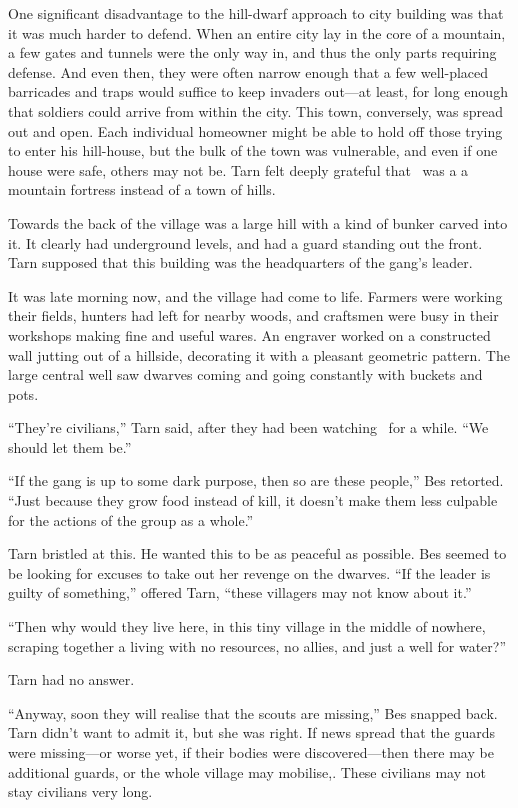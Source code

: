 One significant disadvantage to the hill-dwarf approach to city building was that it was much harder to defend.  When an entire city lay in the core of a mountain, a few gates and tunnels were the only way in, and thus the only parts requiring defense.  And even then, they were often narrow enough that a few well-placed barricades and traps would suffice to keep invaders out---at least, for long enough that soldiers could arrive from within the city.  This town, conversely, was spread out and open.  Each individual homeowner might be able to hold off those trying to enter his hill-house, but the bulk of the town was vulnerable, and even if one house were safe, others may not be.  Tarn felt deeply grateful that \korbarthrond\ was a a mountain fortress instead of a town of hills.

Towards the back of the village was a large hill with a kind of bunker carved into it.  It clearly had underground levels, and had a guard standing out the front.  Tarn supposed that this building was the headquarters of the gang's leader.

It was late morning now, and the village had come to life.  Farmers were working their fields, hunters had left for nearby woods, and craftsmen were busy in their workshops making fine and useful wares.  An engraver worked on a constructed wall jutting out of a hillside, decorating it with a pleasant geometric pattern.  The large central well saw dwarves coming and going constantly with buckets and pots.

``They're civilians,'' Tarn said, after they had been watching \tholkunrond\ for a while.  ``We should let them be.''

``If the gang is up to some dark purpose, then so are these people,'' Bes retorted.  ``Just because they grow food instead of kill, it doesn't make them less culpable for the actions of the group as a whole.''

Tarn bristled at this.  He wanted this to be as peaceful as possible.  Bes seemed to be looking for excuses to take out her revenge on the dwarves.  ``If the leader is guilty of something,'' offered Tarn, ``these villagers may not know about it.''

``Then why would they live here, in this tiny village in the middle of nowhere, scraping together a living with no resources, no allies, and just a well for water?''

Tarn had no answer.

``Anyway, soon they will realise that the scouts are missing,'' Bes snapped back.  Tarn didn't want to admit it, but she was right.  If news spread that the guards were missing---or worse yet, if their bodies were discovered---then there may be additional guards, or the whole village may mobilise,.  These civilians may not stay civilians very long.

